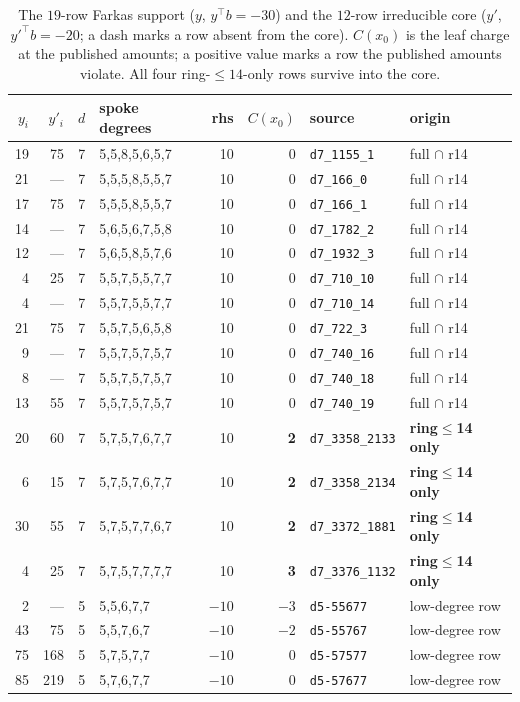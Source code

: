 \documentclass[11pt]{article}
\theoremstyle{definition}
\begin{document}
\begin{table}[h]
\centering\small
\caption{The $19$-row Farkas support ($y$, $y^\top b = -30$) and the $12$-row
irreducible core ($y'$, $y'^\top b = -20$; a dash marks a row absent from the core).
$C(x_0)$ is the leaf charge at the published amounts; a positive value marks a row
the published amounts violate. All four ring-$\le14$-only rows survive into the core.}
\label{tab:cert}
\begin{tabular}{rrrlrrll}
\toprule
$y_i$ & $y'_i$ & $d$ & spoke degrees & rhs & $C(x_0)$ & source & origin \\
\midrule
19 & 75 & 7 & 5,5,8,5,6,5,7 & 10 & 0 & \texttt{d7\_1155\_1}   & full $\cap$ r14 \\
21 & --- & 7 & 5,5,5,8,5,5,7 & 10 & 0 & \texttt{d7\_166\_0}    & full $\cap$ r14 \\
17 & 75 & 7 & 5,5,5,8,5,5,7 & 10 & 0 & \texttt{d7\_166\_1}    & full $\cap$ r14 \\
14 & --- & 7 & 5,6,5,6,7,5,8 & 10 & 0 & \texttt{d7\_1782\_2}   & full $\cap$ r14 \\
12 & --- & 7 & 5,6,5,8,5,7,6 & 10 & 0 & \texttt{d7\_1932\_3}   & full $\cap$ r14 \\
4  & 25 & 7 & 5,5,7,5,5,7,7 & 10 & 0 & \texttt{d7\_710\_10}   & full $\cap$ r14 \\
4  & --- & 7 & 5,5,7,5,5,7,7 & 10 & 0 & \texttt{d7\_710\_14}   & full $\cap$ r14 \\
21 & 75 & 7 & 5,5,7,5,6,5,8 & 10 & 0 & \texttt{d7\_722\_3}    & full $\cap$ r14 \\
9  & --- & 7 & 5,5,7,5,7,5,7 & 10 & 0 & \texttt{d7\_740\_16}   & full $\cap$ r14 \\
8  & --- & 7 & 5,5,7,5,7,5,7 & 10 & 0 & \texttt{d7\_740\_18}   & full $\cap$ r14 \\
13 & 55 & 7 & 5,5,7,5,7,5,7 & 10 & 0 & \texttt{d7\_740\_19}   & full $\cap$ r14 \\
20 & 60 & 7 & 5,7,5,7,6,7,7 & 10 & \textbf{2} & \texttt{d7\_3358\_2133} & \textbf{ring$\le$14 only} \\
6  & 15 & 7 & 5,7,5,7,6,7,7 & 10 & \textbf{2} & \texttt{d7\_3358\_2134} & \textbf{ring$\le$14 only} \\
30 & 55 & 7 & 5,7,5,7,7,6,7 & 10 & \textbf{2} & \texttt{d7\_3372\_1881} & \textbf{ring$\le$14 only} \\
4  & 25 & 7 & 5,7,5,7,7,7,7 & 10 & \textbf{3} & \texttt{d7\_3376\_1132} & \textbf{ring$\le$14 only} \\
2  & --- & 5 & 5,5,6,7,7     & $-10$ & $-3$ & \texttt{d5-55677} & low-degree row \\
43 & 75 & 5 & 5,5,7,6,7     & $-10$ & $-2$ & \texttt{d5-55767} & low-degree row \\
75 & 168 & 5 & 5,7,5,7,7     & $-10$ & 0    & \texttt{d5-57577} & low-degree row \\
85 & 219 & 5 & 5,7,6,7,7     & $-10$ & 0    & \texttt{d5-57677} & low-degree row \\
\bottomrule
\end{tabular}
\end{table}
\end{document}
